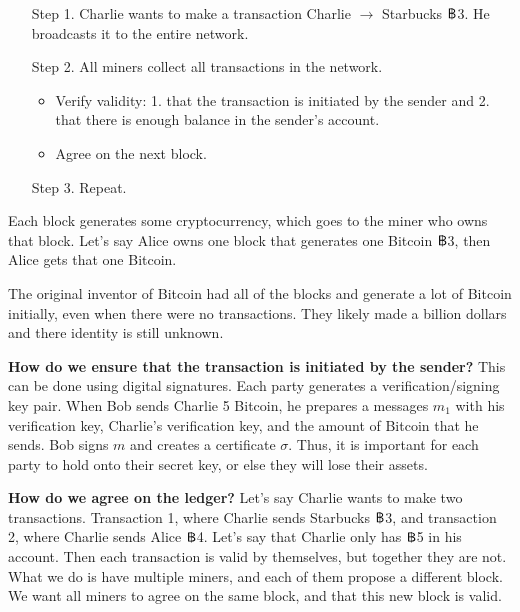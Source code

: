 \begin{center}
    \scriptsize
    \def\svgwidth{\linewidth}
    
\end{center}

\begin{itemize}
    \item[Step 1.] Charlie wants to make a transaction Charlie $\to$ Starbucks $\bitcoin$3. He broadcasts it to the entire network.
    \item[Step 2.] All miners collect all transactions in the network.
    \begin{itemize}
        \item Verify validity: 1. that the transaction is initiated by the sender and 2. that there is enough balance in the sender's account.
        \item Agree on the next block.
    \end{itemize}
    \item[Step 3.] Repeat.
\end{itemize}

Each block generates some cryptocurrency, which goes to the miner who owns that block. Let's say Alice owns one block that generates one Bitcoin $\bitcoin$3, then Alice gets that one Bitcoin.

\begin{remark}
    The original inventor of Bitcoin had all of the blocks and generate a lot of Bitcoin initially, even when there were no transactions. They likely made a billion dollars and there identity is still unknown.
\end{remark}

\textbf{How do we ensure that the transaction is initiated by the sender?} This can be done using digital signatures. Each party generates a verification/signing key pair. When Bob sends Charlie 5 Bitcoin, he prepares a messages $m_1$ with his verification key, Charlie's verification key, and the amount of Bitcoin that he sends. Bob signs $m$ and creates a certificate $\sigma$. Thus, it is important for each party to hold onto their secret key, or else they will lose their assets.

\textbf{How do we agree on the ledger?} Let's say Charlie wants to make two transactions. Transaction 1, where Charlie sends Starbucks $\bitcoin$3, and transaction 2, where Charlie sends Alice $\bitcoin$4. Let's say that Charlie only has $\bitcoin$5 in his account. Then each transaction is valid by themselves, but together they are not. What we do is have multiple miners, and each of them propose a different block. We want all miners to agree on the same block, and that this new block is valid.

